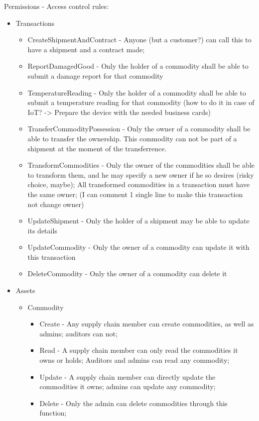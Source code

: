 Permissions - Access control rules:
\begin{itemize}
    \item Transactions
        \begin{itemize}
		\item CreateShipmentAndContract - Anyone (but a customer?) can call this to have a shipment and a contract made;
		\item ReportDamagedGood - Only the holder of a commodity shall be able to submit a damage report for that commodity
		\item TemperatureReading - Only the holder of a commodity shall be able to submit a temperature reading for that commodity (how to do it in case of IoT? -> Prepare the device with the needed business cards)
		\item TransferCommodityPossession - Only the owner of a commodity shall be able to transfer the ownership. This commodity can not be part of a shipment at the moment of the transferrence. 
		\item TransformCommodities - Only the owner of the commodities shall be able to transform them, and he may specify a new owner if he so desires (risky choice, maybe); All transformed commodities in a transaction must have the same owner; (I can comment 1 single line to make this transaction not change owner)
		\item UpdateShipment - Only the holder of a shipment may be able to update its details
		\item UpdateCommodity - Only the owner of a commodity can update it with this transaction
		\item DeleteCommodity - Only the owner of a commodity can delete it
		\end{itemize}
    \item Assets
        \begin{itemize}
        \item Commodity
            \begin{itemize}
			\item Create - Any supply chain member can create commodities, as well as admins; auditors can not;
			\item Read - A supply chain member can only read the commodities it owns or holds; Auditors and admins can read any commodity;
			\item Update - A supply chain member can directly update the commodities it owns; admins can update any commodity;
            \item Delete - Only the admin can delete commodities through this function;

\end{itemize}
\end{itemize}
\end{itemize}
